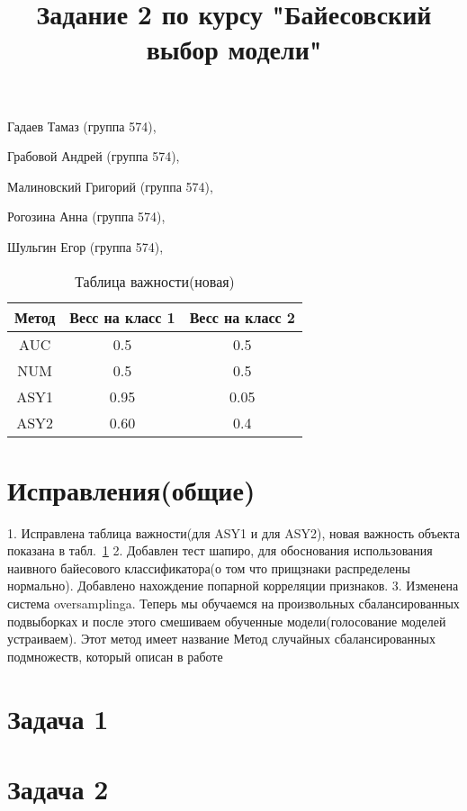 \documentclass[12pt, twoside]{article}
\begin{document}
 

\title{Задание 2 по курсу "Байесовский выбор модели"}
\date{}
\maketitle
\begin{center}
{\LARGE Гадаев Тамаз (группа 574),\par
Грабовой Андрей (группа 574),\par
Малиновский Григорий (группа 574),\par
Рогозина Анна (группа 574), \par
Шульгин Егор (группа 574), \par
}
\end{center}
\begin{table}[h!]
\begin{center}
\begin{tabular}{|c|c|c|}
\hline
	Метод&Весс на класс 1& Весс на класс 2\\
	\hline
	AUC &  0.5 & 0.5 \\
	\hline
	NUM & 0.5 & 0.5\\
	\hline
	ASY1& 0.95 & 0.05 \\
	\hline
	ASY2& 0.60 & 0.4 \\
\hline
\end{tabular}
\end{center}
\caption{Таблица важности(новая)}
\label{table1}
\end{table}
\section{Исправления(общие)}
1. Исправлена таблица важности(для ASY1 и для ASY2), новая важность объекта показана в табл.~\ref{table1}
2. Добавлен тест шапиро, для обоснования использования наивного байесового классификатора(о том что прищзнаки распределены нормально). Добавлено нахождение попарной корреляции признаков.
3. Изменена система oversamplinga. Теперь мы обучаемся на произвольных сбалансированных подвыборках и после этого смешиваем обученные модели(голосование моделей устраиваем). Этот метод имеет название Метод случайных сбалансированных подмножеств, который описан в работе~\cite{work1}

\section{Задача 1}
\section{Задача 2}
\end{document}

